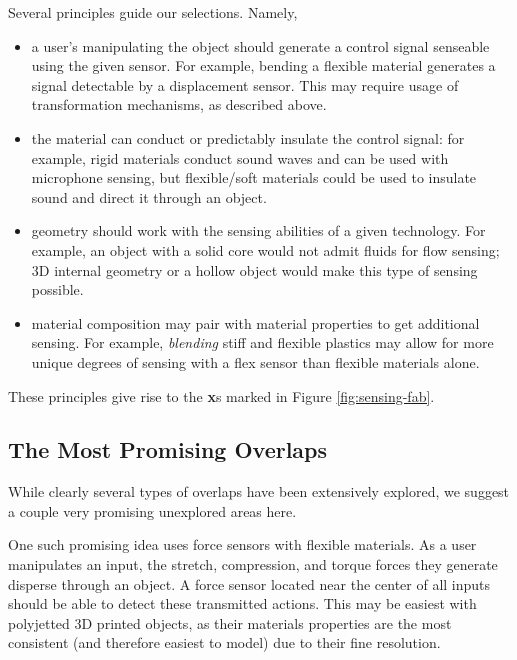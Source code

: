     Several principles guide our selections. Namely,
    \begin{itemize}
        \item a user's manipulating the object should generate a control signal senseable using the given sensor. For example, bending a flexible material generates a signal detectable by a displacement sensor. This may require usage of transformation mechanisms, as described above.
    
        \item the material can conduct or predictably insulate the control signal: for example, rigid materials conduct sound waves and can be used with microphone sensing, but flexible/soft materials could be used to insulate sound and direct it through an object.
    
        \item geometry should work with the sensing abilities of a given technology. For example, an object with a solid core would not admit fluids for flow sensing; 3D internal geometry or a hollow object would make this type of sensing possible.
      
        \item material composition may pair with material properties to get additional sensing. For example, \emph{blending} stiff and flexible plastics may allow for more unique degrees of sensing with a flex sensor than flexible materials alone. 
    \end{itemize}
    
    These principles give rise to the \textbf{x}s marked in Figure \ref{fig:sensing-fab}.
    
\subsection{The Most Promising Overlaps}

    While clearly several types of overlaps have been extensively explored, we suggest a couple very promising unexplored areas here.
    
    One such promising idea uses force sensors with flexible materials. As a user manipulates an input, the stretch, compression, and torque forces they generate disperse through an object. A force sensor located near the center of all inputs should be able to detect these transmitted actions. This may be easiest with polyjetted 3D printed objects, as their materials properties are the most consistent (and therefore easiest to model) due to their fine resolution.
    
